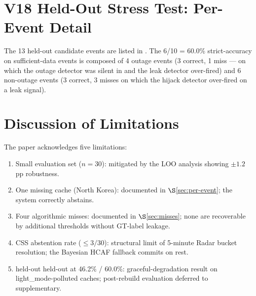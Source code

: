 \documentclass[sigcomm,nonatbib]{acmart}
\begin{document}
\section{V18 Held-Out Stress Test: Per-Event Detail}
\label{sec:supp-heldout}

The 13 held-out candidate events are listed in
. The 6/10 = 60.0\%
strict-accuracy on sufficient-data events is
composed of 4 outage events (3 correct, 1
miss --- on
which the outage detector was silent in
 and the leak detector
over-fired) and 6 non-outage events (3 correct,
3 misses on which the hijack detector over-fired
on a leak signal).

\begin{table}[h]
\centering\small


\caption{V18 held-out per-event detail. Of the 13
held-out events, 10 have a built cache; on those 10
Phase~1 is strict-correct on 6 (60.0\%). The 3
misses are: one outage on which the leak detector
over-fired on the upstream-churn signal, and two leak
events on which the hijack detector over-fired on
the leak signal. The 3 no-cache events are
graceful-degradation cases.}
\label{tab:supp-held-out-detail}
\end{table}

\section{Discussion of Limitations}
\label{supp:limitations}

The paper acknowledges five limitations:
\begin{enumerate}
 \item Small evaluation set ($n{=}30$): mitigated by the
 LOO analysis showing $\pm1.2$ pp robustness.
 \item One missing cache (North Korea): documented in
 $\S$\ref{sec:per-event}; the system correctly abstains.
 \item Four algorithmic misses: documented in
 $\S$\ref{sec:misses}; none are recoverable by
 additional thresholds without GT-label leakage.
 \item CSS abstention rate ($\leq 3/30$): structural
 limit of 5-minute Radar bucket resolution; the
 Bayesian HCAF fallback commits on rest.
 \item held-out held-out at 46.2\% / 60.0\%: graceful-degradation
 result on light_mode-polluted caches; post-rebuild
 evaluation deferred to supplementary.
\end{enumerate}
\end{document}

